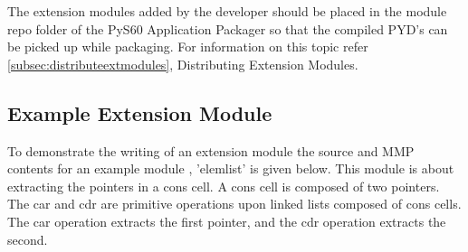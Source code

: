 The extension modules added by the developer should be placed in the module repo
folder of the PyS60 Application Packager so that the compiled PYD's can be picked
up while packaging. For information on this topic refer \ref{subsec:distributeextmodules}, Distributing Extension Modules.

\subsection{Example Extension Module}
To demonstrate the writing of an extension module the source and MMP contents
for an example module , 'elemlist' is given below. This module is about extracting
the pointers in a cons cell. A cons cell is composed of two pointers. The car and cdr
are primitive operations upon linked lists composed of cons cells. The car operation
extracts the first pointer, and the cdr operation extracts the second.

